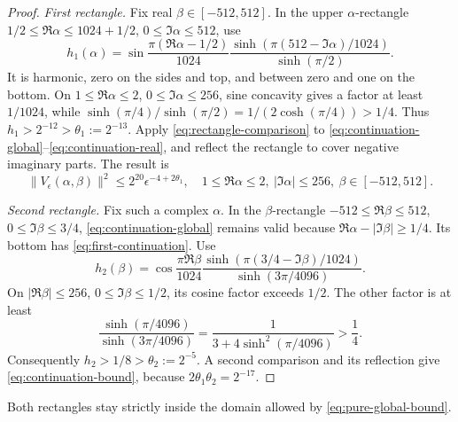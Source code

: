 \begin{proof}
\emph{First rectangle.} Fix real \(\beta\in[-512,512]\). In the upper \(\alpha\)-rectangle
\(1/2\le\Re \alpha\le1024+1/2\), \(0\le\Im \alpha\le512\), use
\begin{equation}
 h_1(\alpha)=\sin\frac{\pi(\Re \alpha-1/2)}{1024}
       \frac{\sinh(\pi(512-\Im \alpha)/1024)}{\sinh(\pi/2)}.           \label{eq:first-barrier}
\end{equation}
It is harmonic, zero on the sides and top, and between zero and one on
the bottom. On \(1\le\Re \alpha\le2\), \(0\le\Im \alpha\le256\), sine concavity
gives a factor at least \(1/1024\), while
\(\sinh(\pi/4)/\sinh(\pi/2)=1/(2\cosh(\pi/4))>1/4\).
Thus \(h_1>2^{-12}>\theta_1:=2^{-13}\). Apply \eqref{eq:rectangle-comparison} to \eqref{eq:continuation-global}–\eqref{eq:continuation-real}, and
reflect the rectangle to cover negative imaginary parts. The result is
\begin{equation}
 \|V_\epsilon(\alpha,\beta)\|^2\le2^{20}\epsilon^{-4+2\theta_1},
 \quad 1\le\Re \alpha\le2,\ |\Im \alpha|\le256,\ \beta\in[-512,512].          \label{eq:first-continuation}
\end{equation}

\emph{Second rectangle.} Fix such a complex \(\alpha\). In the \(\beta\)-rectangle
\(-512\le\Re \beta\le512\), \(0\le\Im \beta\le3/4\), \eqref{eq:continuation-global} remains valid
because \(\Re \alpha-|\Im \beta|\ge1/4\). Its bottom has \eqref{eq:first-continuation}. Use
\begin{equation}
 h_2(\beta)=\cos\frac{\pi\Re \beta}{1024}
       \frac{\sinh(\pi(3/4-\Im \beta)/1024)}{\sinh(3\pi/4096)}.     \label{eq:second-barrier}
\end{equation}
On \(|\Re \beta|\le256\), \(0\le\Im \beta\le1/2\), its cosine factor exceeds
\(1/2\). The other factor is at least
\[
 \frac{\sinh(\pi/4096)}{\sinh(3\pi/4096)}
 =\frac1{3+4\sinh^2(\pi/4096)}>\frac14.
\]
Consequently \(h_2>1/8>\theta_2:=2^{-5}\). A second comparison and its
reflection give \eqref{eq:continuation-bound}, because \(2\theta_1\theta_2=2^{-17}\). \end{proof}

Both rectangles stay strictly inside the domain allowed by \eqref{eq:pure-global-bound}.
